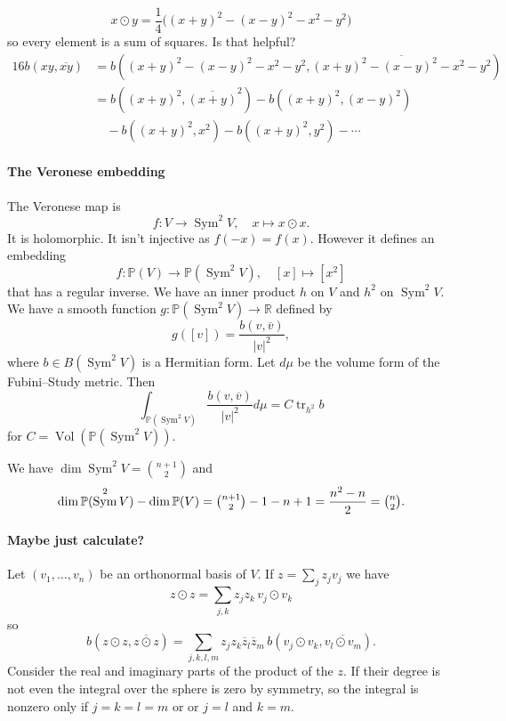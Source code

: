 \documentclass[11pt]{amsart}
\theoremstyle{definition}
\newcommand{\kk}[1]{\mathbb{#1}}
\def\ov#1{\overline{#1}}
\DeclareMathOperator{\Vol}{Vol}
\DeclareMathOperator{\Sym}{Sym}
\DeclareMathOperator{\tr}{tr}
\begin{document}
$$
x \odot y
= \frac14 \bigl( (x + y)^2 - (x - y)^2 - x^2 - y^2 \bigr)
$$
so every element is a sum of squares.
Is that helpful?
\begin{align*}
16 b(xy, \ov{xy})
&= b((x{+}y)^2 - (x{-}y)^2 - x^2 - y^2, \ov{(x{+}y)^2 - (x{-}y)^2 - x^2 - y^2})
\\
&= b((x+y)^2, \ov{(x+y)}^2)
- b((x+y)^2,(x-y)^2)
\\
&\quad
- b((x+y)^2,x^2)
- b((x+y)^2,y^2)
- \cdots
\end{align*}

\paragraph{The Veronese embedding}

The Veronese map is
$$
f : V \to \Sym^2 V,
\quad
x \mapsto x \odot x.
$$
It is holomorphic.
It isn't injective as $f(- x) = f(x)$.
However it defines an embedding
$$
f : \kk P(V) \to \kk P(\Sym^2 V),
\quad
[x] \mapsto [x^2]
$$
that has a regular inverse.
We have an inner product $h$ on $V$ and $h^2$ on $\Sym^2 V$.
We have a smooth function $g : \kk P(\Sym^2 V) \to \kk R$ defined by
$$
g([v]) = \frac{b(v, \ov{v})}{|v|^2},
$$
where $b \in B(\Sym^2 V)$ is a Hermitian form.
Let $d\mu$ be the volume form of the Fubini--Study metric.
Then
$$
\int_{\kk P(\Sym^2 V)} \frac{b(v, \ov v)}{|v|^2} d\mu
= C \tr_{h^2} b
$$
for $C = \Vol(\kk P(\Sym^2 V))$.

We have $\dim \Sym^2 V = \binom{n+1}2$ and
$$
\dim \kk P(\Sym^2 V) - \dim \kk P(V)
= \tbinom{n+1}{2} - 1 - n + 1
= \frac{n^2 - n}{2}
= \tbinom{n}{2}.
$$



\paragraph{Maybe just calculate?}


Let $(v_1, \ldots, v_n)$ be an orthonormal basis of $V$.
If $z = \sum_j z_j v_j$ we have
$$
z \odot z
= \sum_{j,k} z_j z_k \, v_j \odot v_k
$$
so
$$
b(z \odot z, \ov{z \odot z})
= \sum_{j,k,l,m} z_j z_k \ov z_l \ov z_m
\, b(v_j \odot v_k, \ov{v_l \odot v_m}).
$$
Consider the real and imaginary parts of the product of the $z$.
If their degree is not even the integral over the sphere is zero by symmetry,
so the integral is nonzero only if $j = k = l = m$ or or $j = l$ and $k = m$.
\end{document}
